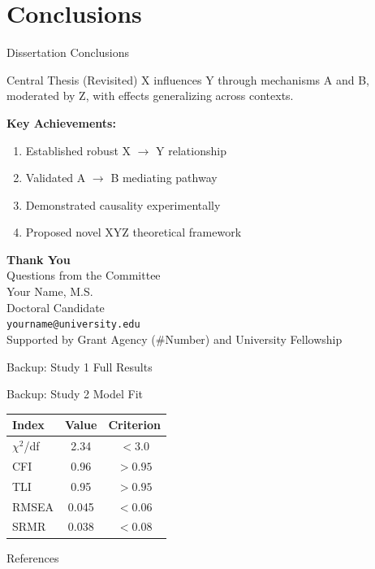 \documentclass[aspectratio=169,12pt]{beamer}
\begin{document}
\section{Conclusions}

\begin{frame}{Dissertation Conclusions}
  \begin{exampleblock}{Central Thesis (Revisited)}
    X influences Y through mechanisms A and B, moderated by Z, with effects generalizing across contexts.
  \end{exampleblock}
  \vspace{0.5cm}
  \textbf{Key Achievements:}
  \begin{enumerate}
    \item Established robust X $\to$ Y relationship
    \item Validated A $\to$ B mediating pathway
    \item Demonstrated causality experimentally
    \item Proposed novel XYZ theoretical framework
  \end{enumerate}
\end{frame}

\begin{frame}[plain]
  \begin{center}
    {\LARGE \textbf{Thank You}}\\[1cm]
    {\Large Questions from the Committee}\\[1.5cm]
    Your Name, M.S.\\
    Doctoral Candidate\\
    \texttt{yourname@university.edu}\\[1cm]
    {\footnotesize Supported by Grant Agency (\#Number) and University Fellowship}
  \end{center}
\end{frame}

\appendix

\begin{frame}{Backup: Study 1 Full Results}
\end{frame}

\begin{frame}{Backup: Study 2 Model Fit}
  \begin{table}
    \centering
    \begin{tabular}{lcc}
      \toprule
      \textbf{Index} & \textbf{Value} & \textbf{Criterion} \\
      \midrule
      $\chi^2$/df & 2.34 & $< 3.0$ \\
      CFI & 0.96 & $> 0.95$ \\
      TLI & 0.95 & $> 0.95$ \\
      RMSEA & 0.045 & $< 0.06$ \\
      SRMR & 0.038 & $< 0.08$ \\
      \bottomrule
    \end{tabular}
  \end{table}
\end{frame}

\begin{frame}[allowframebreaks]{References}
  \printbibliography
\end{frame}
\end{document}
